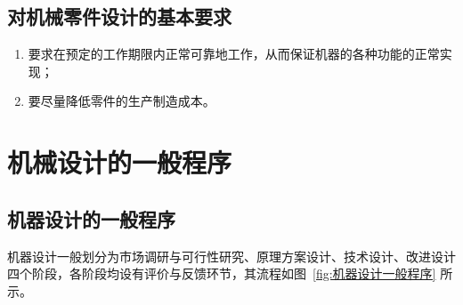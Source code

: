 \subsection{对机械零件设计的基本要求}

\begin{enumerate}
	\item 要求在预定的工作期限内正常可靠地工作，从而保证机器的各种功能的正常实现；
	\item 要尽量降低零件的生产制造成本。
\end{enumerate}

\section{机械设计的一般程序}
\label{sec:机械设计的一般程序}

\subsection{机器设计的一般程序}

机器设计一般划分为市场调研与可行性研究、原理方案设计、技术设计、改进设计四个阶段，各阶段均设有评价与反馈环节，其流程如图~\ref{fig:机器设计一般程序} 所示。

